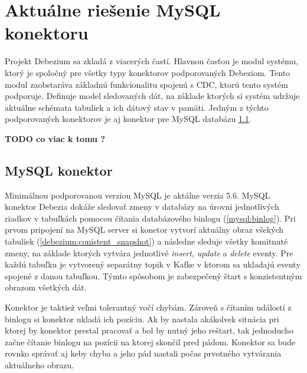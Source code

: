 \chapter{Aktuálne riešenie MySQL konektoru}
Projekt Debezium sa zkladá z viacerých častí. Hlavnou časťou je modul systému, ktorý je spoločný pre všetky typy konektorov podporovaných Debeziom. Tento modul zaobstaráva základnú funkcionalitu spojenú s CDC, ktorú tento systém podporuje. Definuje model sledovaných dát, na základe ktorých si systém udržuje aktuálne schémata tabuliek a ich dátový stav v pamäti. Jedným z týchto podporovaných konektorov je aj konektor pre MySQL databázu \ref{debezium:mysql_connector}.

\textbf{TODO co viac k tomu ?} 

\section{MySQL konektor}\label{debezium:mysql_connector}
Minimálnou podporovanou verziou MySQL je aktálne verzia 5.6. MySQL konektor Debezia dokáže sledovať zmeny v databázy na úrovni jednotlivých riadkov v tabuľkách pomocou čítania databázového binlogu (\ref{mysql:binlog}). Pri prvom pripojení na MySQL server si konetor vytvorí aktuálny obraz všekých tabuliek (\ref{debezium:conistent_snapshot}) a následne sleduje všetky komitnuté zmeny, na základe ktorých vytvára jednotlivé \textit{insert}, \textit{update} a \textit{delete} eventy. Pre každú tabuľku je vytvorený separátny topik v Kafke v ktorom sa ukladajú eventy spojené z danou tabuľkou. Týmto spôsobom je zabezpečený štart s konzistentným obrazom všetkých dát.

Konektor je taktiež veľmi tolerantný vočí chybám. Zároveň s čítaním událostí z binlogu si konektor ukladá ich pozíciu. Ak by nastala akákolvek situácia pri ktorej by konektor prestal pracovať a bol by nutný jeho reštart, tak jednoducho začne čítanie binlogu na pozícii na ktorej skončil pred pádom. Konektor sa bude rovnko správať aj keby chyba a jeho pád nastali počas prvotného vytvárania aktuálneho obrazu.

